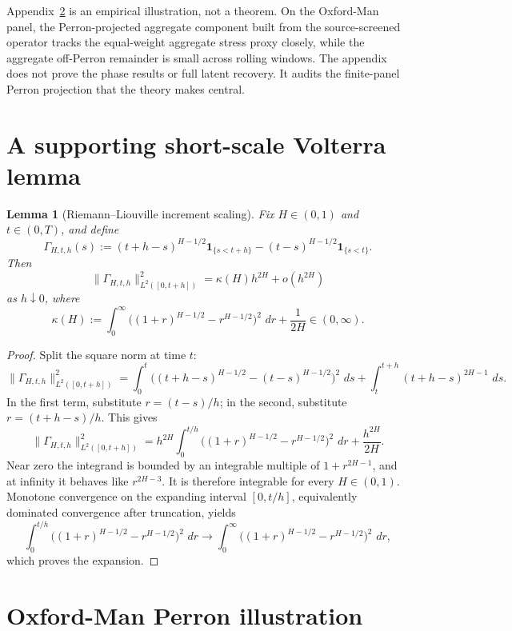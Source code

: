 \documentclass[11pt,a4paper]{amsart}
\theoremstyle{plain}
\newtheorem{lemma}[theorem]{Lemma}
\theoremstyle{definition}
\theoremstyle{remark}
\newcommand{\one}{\mathbf{1}}
\newcommand{\dd}{\,d}
\begin{document}
Appendix~\ref{app:perron-validation} is an empirical illustration, not a theorem.  On the
Oxford-Man panel, the Perron-projected aggregate component built from the source-screened operator
tracks the equal-weight aggregate stress proxy closely, while the aggregate off-Perron remainder is
small across rolling windows.  The appendix does not prove the phase results or full latent
recovery.  It audits the finite-panel Perron projection that the theory makes central.
\appendix

\section{A supporting short-scale Volterra lemma}

\begin{lemma}[Riemann--Liouville increment scaling]\label{lem:RL-scaling}
Fix \(H\in(0,1)\) and \(t\in(0,T)\), and define
\[
        \Gamma_{H,t,h}(s)
        :=
        (t+h-s)^{H-1/2}\one_{\{s<t+h\}}
        -
        (t-s)^{H-1/2}\one_{\{s<t\}}.
\]
Then
\[
        \|\Gamma_{H,t,h}\|_{L^2([0,t+h])}^2
        =
        \kappa(H)h^{2H}+o(h^{2H})
\]
as \(h\downarrow0\), where
\[
        \kappa(H)
        :=
        \int_0^\infty\bigl((1+r)^{H-1/2}-r^{H-1/2}\bigr)^2\,\dd r
        +
        \frac{1}{2H}
        \in(0,\infty).
\]
\end{lemma}

\begin{proof}
Split the square norm at time \(t\):
\[
        \|\Gamma_{H,t,h}\|_{L^2([0,t+h])}^2
        =
        \int_0^t
        \bigl((t+h-s)^{H-1/2}-(t-s)^{H-1/2}\bigr)^2\,\dd s
        +
        \int_t^{t+h}(t+h-s)^{2H-1}\,\dd s.
\]
In the first term, substitute \(r=(t-s)/h\); in the second, substitute \(r=(t+h-s)/h\).  This gives
\[
        \|\Gamma_{H,t,h}\|_{L^2([0,t+h])}^2
        =
        h^{2H}
        \int_0^{t/h}\bigl((1+r)^{H-1/2}-r^{H-1/2}\bigr)^2\,\dd r
        +
        \frac{h^{2H}}{2H}.
\]
Near zero the integrand is bounded by an integrable multiple of \(1+r^{2H-1}\), and at infinity
it behaves like \(r^{2H-3}\).  It is therefore integrable for every \(H\in(0,1)\).  Monotone
convergence on the expanding interval \([0,t/h]\), equivalently dominated convergence after
truncation, yields
\[
        \int_0^{t/h}\bigl((1+r)^{H-1/2}-r^{H-1/2}\bigr)^2\,\dd r
        \longrightarrow
        \int_0^\infty\bigl((1+r)^{H-1/2}-r^{H-1/2}\bigr)^2\,\dd r,
\]
which proves the expansion.
\end{proof}

\section{Oxford-Man Perron illustration}\label{app:perron-validation}
\end{document}
